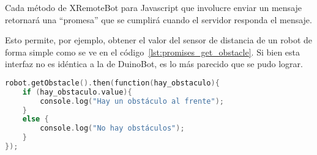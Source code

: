 Cada método de XRemoteBot para Javascript que involucre enviar un mensaje
retornará una ``promesa'' que se cumplirá cuando el servidor responda
el mensaje.

Esto permite, por ejemplo, obtener el valor del sensor de distancia de un 
robot de forma simple como se ve en el código~\ref{lst:promises_get_obstacle}.
Si bien esta interfaz no es idéntica a la de DuinoBot, es lo más parecido
que se pudo lograr.

\begin{lstlisting}[language=C,
caption={Implementación de \texttt{getObstacle()} con ``promesas''},
label=lst:promises_get_obstacle]
robot.getObstacle().then(function(hay_obstaculo){
    if (hay_obstaculo.value){
        console.log("Hay un obstáculo al frente");
    }
    else {
        console.log("No hay obstáculos");
    }
});
\end{lstlisting}
